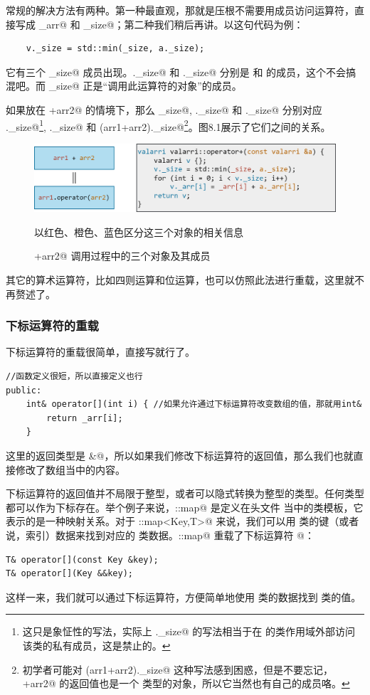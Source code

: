 常规的解决方法有两种。第一种最直观，那就是压根不需要用成员访问运算符，直接写成 \lstinline@_arr@ 和 \lstinline@_size@；第二种我们稍后再讲。以这句代码为例：
\begin{lstlisting}
    v._size = std::min(_size, a._size);
\end{lstlisting}
它有三个 \lstinline@_size@ 成员出现。\lstinline@v._size@ 和 \lstinline@a._size@ 分别是 \lstinline@v@ 和 \lstinline@a@ 的成员，这个不会搞混吧。而 \lstinline@_size@ 正是``调用此运算符的对象''的成员。\par
如果放在 +arr2@ 的情境下，那么 \lstinline@_size@, \lstinline@a._size@ 和 \lstinline@v._size@ 分别对应 ._size@\footnote{这只是象怔性的写法，实际上 ._size@ 的写法相当于在 \lstinline@valarri@ 的类作用域外部访问该类的私有成员，这是禁止的。}, ._size@ 和 \lstinline@(arr1+arr2)._size@\footnote{初学者可能对 \lstinline@(arr1+arr2)._size@ 这种写法感到困惑，但是不要忘记，+arr2@ 的返回值也是一个 \lstinline@valarri@ 类型的对象，所以它当然也有自己的成员咯。}。图8.1展示了它们之间的关系。\par
\begin{figure}[htbp]
    \centering
    \includegraphics[width=\textwidth]{../images/generalized_parts/08_operator_overloading_as_member_function.drawio.png}
    \caption{+arr2@ 调用过程中的三个对象及其成员}
    \footnotesize{以红色、橙色、蓝色区分这三个对象的相关信息}
\end{figure}
其它的算术运算符，比如四则运算和位运算，也可以仿照此法进行重载，这里就不再赘述了。\par
\subsubsection*{下标运算符的重载}
下标运算符的重载很简单，直接写就行了。
\begin{lstlisting}
//函数定义很短，所以直接定义也行
public:
    int& operator[](int i) { //如果允许通过下标运算符改变数组的值，那就用int&
        return _arr[i];
    }
\end{lstlisting}
这里的返回类型是 \lstinline@int&@，所以如果我们修改下标运算符的返回值，那么我们也就直接修改了数组当中的内容。\par
下标运算符的返回值并不局限于整型，或者可以隐式转换为整型的类型。任何类型都可以作为下标存在。举个例子来说，\lstinline@std::map@ 是定义在头文件 \lstinline@map@ 当中的类模板，它表示的是一种映射关系。对于 \lstinline@std::map<Key,T>@ 来说，我们可以用 \lstinline@Key@ 类的键（或者说，索引）数据来找到对应的 \lstinline@T@ 类数据。\lstinline@std::map@ 重载了下标运算符 \lstinline@[]@：
\begin{lstlisting}
T& operator[](const Key &key);
T& operator[](Key &&key);
\end{lstlisting}
这样一来，我们就可以通过下标运算符，方便简单地使用 \lstinline@Key@ 类的数据找到 \lstinline@T@ 类的值。\par
